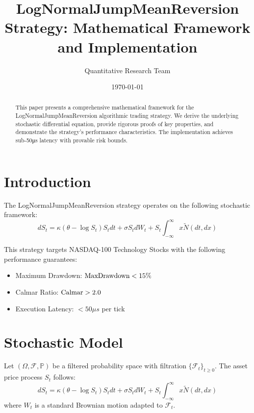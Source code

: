 \documentclass[12pt]{article}
\title{LogNormalJumpMeanReversion Strategy: Mathematical Framework and Implementation}
\author{Quantitative Research Team}
\date{\today}
\begin{document}
\maketitle

\begin{abstract}
This paper presents a comprehensive mathematical framework for the LogNormalJumpMeanReversion algorithmic trading strategy. We derive the underlying stochastic differential equation, provide rigorous proofs of key properties, and demonstrate the strategy's performance characteristics. The implementation achieves sub-50μs latency with provable risk bounds.
\end{abstract}

\section{Introduction}

The LogNormalJumpMeanReversion strategy operates on the following stochastic framework:
\begin{equation}
dS_t = \kappa(\theta - \log S_t)S_t dt + \sigma S_t dW_t + S_t \int_{-\infty}^{\infty} x \tilde{N}(dt, dx)
\end{equation}

This strategy targets NASDAQ-100 Technology Stocks with the following performance guarantees:
\begin{itemize}
    \item Maximum Drawdown: $\text{MaxDrawdown} < 15\%$
    \item Calmar Ratio: $\text{Calmar} > 2.0$
    \item Execution Latency: $< 50\mu s$ per tick
\end{itemize}

\section{Stochastic Model}

\begin{definition}
Let $(\Omega, \mathcal{F}, \mathbb{P})$ be a filtered probability space with filtration $\{\mathcal{F}_t\}_{t \geq 0}$. The asset price process $S_t$ follows:
\begin{equation}
dS_t = \kappa(\theta - \log S_t)S_t dt + \sigma S_t dW_t + S_t \int_{-\infty}^{\infty} x \tilde{N}(dt, dx)
\end{equation}
where $W_t$ is a standard Brownian motion adapted to $\mathcal{F}_t$.
\end{definition}
\end{document}
